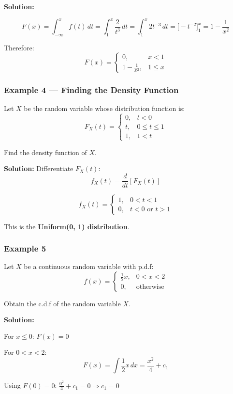 \documentclass[
]{article}
\begin{document}
\textbf{Solution:}

\[F(x) = \int_{-\infty}^{x} f(t)\,dt = \int_{1}^{x} \frac{2}{t^3}\,dt = \int_{1}^{x} 2t^{-3}\,dt = \Big[-t^{-2}\Big]_1^x = 1 - \frac{1}{x^2}\]

Therefore:
\[F(x) = \begin{cases} 0, & x < 1 \\ 1 - \frac{1}{x^2}, & 1 \leq x \end{cases}\]

\subsubsection{Example 4 --- Finding the Density
Function}\label{example-4-finding-the-density-function}

Let \(X\) be the random variable whose distribution function is:
\[F_X(t) = \begin{cases} 0, & t < 0 \\ t, & 0 \leq t \leq 1 \\ 1, & 1 < t \end{cases}\]

Find the density function of \(X\).

\textbf{Solution:} Differentiate \(F_X(t)\):
\[f_X(t) = \frac{d}{dt}\left[F_X(t)\right]\]

\[f_X(t) = \begin{cases} 1, & 0 < t < 1 \\ 0, & t < 0 \text{ or } t > 1 \end{cases}\]

This is the \textbf{Uniform(0, 1) distribution}.

\subsubsection{Example 5}\label{example-5}

Let \(X\) be a continuous random variable with p.d.f:
\[f(x) = \begin{cases} \frac{1}{2}x, & 0 < x < 2 \\ 0, & \text{otherwise} \end{cases}\]

Obtain the c.d.f of the random variable \(X\).

\textbf{Solution:}

For \(x \leq 0\): \(F(x) = 0\)

For \(0 < x < 2\):
\[F(x) = \int \frac{1}{2}x\,dx = \frac{x^2}{4} + c_1\]

Using \(F(0) = 0\): \(\frac{0^2}{4} + c_1 = 0 \Rightarrow c_1 = 0\)
\end{document}
